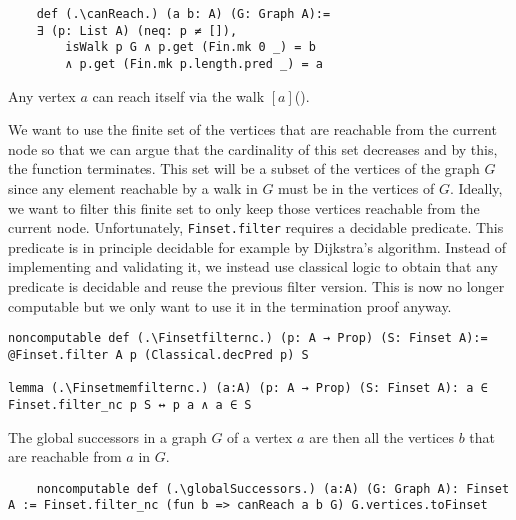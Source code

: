 \begin{lstlisting}
    def (.\canReach.) (a b: A) (G: Graph A):= 
    ∃ (p: List A) (neq: p ≠ []), 
        isWalk p G ∧ p.get (Fin.mk 0 _) = b 
        ∧ p.get (Fin.mk p.length.pred _) = a
\end{lstlisting}

Any vertex $a$ can reach itself via the walk $[a]$(\canReachrefl).

We want to use the finite set of the vertices that are reachable from the current node so that we can argue that the cardinality of this set decreases and by this, the function terminates. This set will be a subset of the vertices of the graph $G$ since any element reachable by a walk in $G$ must be in the vertices of $G$. Ideally, we want to filter this finite set to only keep those vertices reachable from the current node. Unfortunately, \lstinline|Finset.filter| requires a decidable predicate. This predicate is in principle decidable for example by Dijkstra's algorithm. Instead of implementing and validating it, we instead use classical logic to obtain that any predicate is decidable and reuse the previous filter version. This is now no longer computable but we only want to use it in the termination proof anyway.

\begin{lstlisting}
noncomputable def (.\Finsetfilternc.) (p: A → Prop) (S: Finset A):= @Finset.filter A p (Classical.decPred p) S

lemma (.\Finsetmemfilternc.) (a:A) (p: A → Prop) (S: Finset A): a ∈ Finset.filter_nc p S ↔ p a ∧ a ∈ S
\end{lstlisting}

The global successors in a graph $G$ of a vertex $a$ are then all the vertices $b$ that are reachable from $a$ in $G$.

\begin{lstlisting}
    noncomputable def (.\globalSuccessors.) (a:A) (G: Graph A): Finset A := Finset.filter_nc (fun b => canReach a b G) G.vertices.toFinset
\end{lstlisting}

